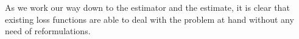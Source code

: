 As we work our way down to the estimator and the estimate, it is clear that existing loss functions are able to deal with the problem at hand without any need of reformulations. 




